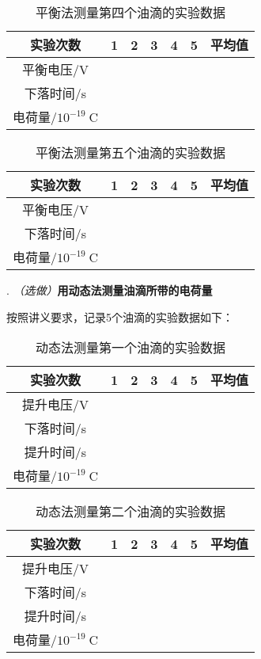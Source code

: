 \documentclass[11pt,a4paper]{ctexart}
\begin{document}
\newpage
\begin{table}[h!]
\centering
\caption{平衡法测量第四个油滴的实验数据}
\label{my-label}
\begin{tabular}{|c|p{12mm}|p{12mm}|p{12mm}|p{12mm}|p{12mm}|p{12mm}|}
\hline
实验次数 & 1 & 2 & 3 & 4 & 5 & 平均值 \\ \hline
平衡电压/V &  &  &  &  &  &  \\ \hline
下落时间/s &  &  &  &  &  &  \\ \hline
电荷量/$10^{-19}\mathrm{\ C}$ &  &  &  &  &  &  \\ \hline
\end{tabular}
\end{table}
\begin{table}[h!]
\centering
\caption{平衡法测量第五个油滴的实验数据}
\label{my-label}
\begin{tabular}{|c|p{12mm}|p{12mm}|p{12mm}|p{12mm}|p{12mm}|p{12mm}|}
\hline
实验次数 & 1 & 2 & 3 & 4 & 5 & 平均值 \\ \hline
平衡电压/V &  &  &  &  &  &  \\ \hline
下落时间/s &  &  &  &  &  &  \\ \hline
电荷量/$10^{-19}\mathrm{\ C}$ &  &  &  &  &  &  \\ \hline
\end{tabular}
\end{table}
\vspace{1cm}
. \emph{（选做）}\textbf{用动态法测量油滴所带的电荷量}\par
按照讲义要求，记录5个油滴的实验数据如下：
\begin{table}[h!]
\centering
\caption{动态法测量第一个油滴的实验数据}
\label{my-label}
\begin{tabular}{|c|p{12mm}|p{12mm}|p{12mm}|p{12mm}|p{12mm}|p{12mm}|}
\hline
实验次数 & 1 & 2 & 3 & 4 & 5 & 平均值 \\ \hline
提升电压/V &  &  &  &  &  &  \\ \hline
下落时间/s &  &  &  &  &  &  \\ \hline
提升时间/s &  &  &  &  &  &  \\ \hline
电荷量/$10^{-19}\mathrm{\ C}$ &  &  &  &  &  &  \\ \hline
\end{tabular}
\end{table}
\begin{table}[h!]
\centering
\caption{动态法测量第二个油滴的实验数据}
\label{my-label}
\begin{tabular}{|c|p{12mm}|p{12mm}|p{12mm}|p{12mm}|p{12mm}|p{12mm}|}
\hline
实验次数 & 1 & 2 & 3 & 4 & 5 & 平均值 \\ \hline
提升电压/V &  &  &  &  &  &  \\ \hline
下落时间/s &  &  &  &  &  &  \\ \hline
提升时间/s &  &  &  &  &  &  \\ \hline
电荷量/$10^{-19}\mathrm{\ C}$ &  &  &  &  &  &  \\ \hline
\end{tabular}
\end{table}
\end{document}
